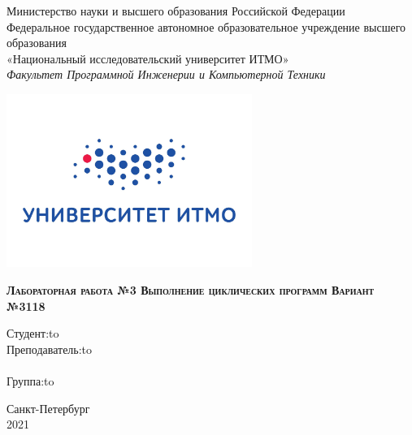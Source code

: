 \Large
\thispagestyle{empty}
\begin{center}
Министерство науки и высшего образования Российской Федерации \\
Федеральное государственное автономное образовательное учреждение высшего образования \\
«Национальный исследовательский университет ИТМО» \\
\vspace{1em}
\textsl{Факультет Программной Инженерии и Компьютерной Техники}\\
\end{center}

\vspace{1em}

\thispagestyle{empty}
\begin{center}
\includegraphics[width=8cm]{imgs/itmo.jpg}
\end{center}

\vspace{3em}

\begin{center}
\large{
\textsc{\textbf{
Лабораторная работа №3  \linebreak 
Выполнение циклических программ \linebreak 
Вариант №3118 \linebreak
}}
}
\end{center}

\vspace{10em}



\newbox{\lbox}
\savebox{\lbox}{\hbox{\studName\hfill}}
\newlength{\maxl}
\setlength{\maxl}{\wd\lbox}
\hfill\parbox{10cm}{
\hspace*{5cm}\hspace*{-5cm}Студент:\hfill\hbox to\maxl{\studName\hfill}\\
\hspace*{5cm}\hspace*{-5cm}Преподаватель:\hfill\hbox to\maxl{\teacherName}\\
\\
\hspace*{5cm}\hspace*{-5cm}Группа:\hfill\hbox to\maxl{\groupNumber}\\
}

\vspace{\fill}

\begin{center}
Санкт-Петербург \\2021
\end{center}
\newpage